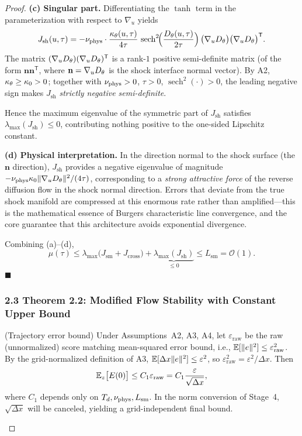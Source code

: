 \begin{proof}
\textbf{(c) Singular part.} Differentiating the $\tanh$ term in the parameterization with respect to $\nabla_u$ yields
\begin{equation}
  J_{\mathrm{sh}}(u,\tau) = -\nu_{\mathrm{phys}} \cdot \frac{\kappa_{\theta}(u,\tau)}{4\tau} \, \operatorname{sech}^2\!\Bigl(\frac{D_{\theta}(u,\tau)}{2\tau}\Bigr) \, \bigl(\nabla_u D_{\theta}\bigr)\bigl(\nabla_u D_{\theta}\bigr)^\mathsf{T}.
\end{equation}
The matrix $(\nabla_u D_{\theta})(\nabla_u D_{\theta})^\mathsf{T}$ is a rank-$1$ positive semi-definite matrix (of the form $\mathbf{n}\mathbf{n}^\mathsf{T}$, where $\mathbf{n} = \nabla_u D_{\theta}$ is the shock interface normal vector).
By A2, $\kappa_{\theta} \geq \kappa_0 > 0$; together with $\nu_{\mathrm{phys}} > 0$, $\tau > 0$, $\operatorname{sech}^2(\cdot) > 0$, the leading negative sign makes $J_{\mathrm{sh}}$ \emph{strictly negative semi-definite}.

Hence the maximum eigenvalue of the symmetric part of $J_{\mathrm{sh}}$ satisfies $\lambda_{\max}(J_{\mathrm{sh}}) \leq 0$, contributing nothing positive to the one-sided Lipschitz constant.

\textbf{(d) Physical interpretation.} In the direction normal to the shock surface (the $\mathbf{n}$ direction), $J_{\mathrm{sh}}$ provides a negative eigenvalue of magnitude $-\nu_{\mathrm{phys}} \kappa_0 \lVert \nabla_u D_{\theta} \rVert^2 / (4\tau)$, corresponding to a \emph{strong attractive force} of the reverse diffusion flow in the shock normal direction. Errors that deviate from the true shock manifold are compressed at this enormous rate rather than amplified---this is the mathematical essence of Burgers characteristic line convergence, and the core guarantee that this architecture avoids exponential divergence.

Combining (a)--(d),
\begin{equation}
  \mu(\tau) \leq \lambda_{\max}\!\bigl(J_{\mathrm{sm}} + J_{\mathrm{cross}}\bigr) + \underbrace{\lambda_{\max}(J_{\mathrm{sh}})}_{\leq 0} \leq L_{\mathrm{sm}} = \mathcal{O}(1).
\end{equation}
\hfill$\blacksquare$

\subsubsection{2.3 Theorem 2.2: Modified Flow Stability with Constant Upper Bound}

\begin{lemma}\label{lem:2.2}
(Trajectory error bound) Under Assumptions~A2, A3, A4, let $\varepsilon_{\mathrm{raw}}$ be the raw (unnormalized) score matching mean-squared error bound, i.e., $\mathbb{E}[\lVert e \rVert^2] \leq \varepsilon_{\mathrm{raw}}^2$.
By the grid-normalized definition of A3, $\mathbb{E}[\Delta x \lVert e \rVert^2] \leq \varepsilon^2$, so $\varepsilon_{\mathrm{raw}}^2 = \varepsilon^2 / \Delta x$. Then
\begin{equation}
  \mathbb{E}_z\bigl[E(0)\bigr] \leq C_1 \varepsilon_{\mathrm{raw}} = C_1 \frac{\varepsilon}{\sqrt{\Delta x}},
\end{equation}
where $C_1$ depends only on $T_d, \nu_{\mathrm{phys}}, L_{\mathrm{sm}}$. In the norm conversion of Stage~4, $\sqrt{\Delta x}$ will be canceled, yielding a grid-independent final bound.
\end{lemma}


\end{proof}
